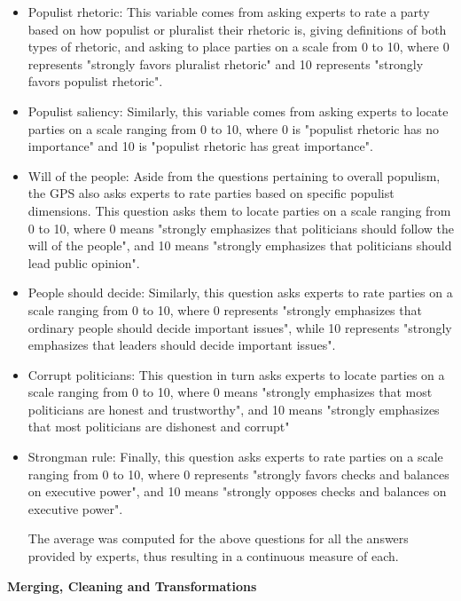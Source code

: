 \documentclass[12pt,letterpaper]{article}
\begin{document}
\begin{itemize}
	\item Populist rhetoric: This variable comes from asking experts to rate a party based on how populist or pluralist their rhetoric is, giving definitions of both types of rhetoric, and asking to place parties on a scale from 0 to 10, where 0 represents "strongly favors pluralist rhetoric" and 10 represents "strongly favors populist rhetoric". 
	\item Populist saliency: Similarly, this variable comes from asking experts to locate parties on a scale ranging from 0 to 10, where 0 is "populist rhetoric has no importance" and 10 is "populist rhetoric has great importance". 
	\item Will of the people: Aside from the questions pertaining to overall populism, the GPS also asks experts to rate parties based on specific populist dimensions. This question asks them to locate parties on a scale ranging from 0 to 10, where 0 means "strongly emphasizes that politicians should follow the will of the people", and 10 means "strongly emphasizes that politicians should lead public opinion".
	\item People should decide: Similarly, this question asks experts to rate parties on a scale ranging from 0 to 10, where 0 represents "strongly emphasizes that ordinary people should decide important issues", while 10 represents "strongly emphasizes that leaders should decide important issues". 
	\item Corrupt politicians: This question in turn asks experts to locate parties on a scale ranging from 0 to 10, where 0 means "strongly emphasizes that most politicians are honest and trustworthy", and 10 means "strongly emphasizes that most politicians are dishonest and corrupt"
	\item Strongman rule: Finally, this question asks experts to rate parties on a scale ranging from 0 to 10, where 0 represents "strongly favors checks and balances on executive power", and 10 means "strongly opposes checks and balances on executive power". 
	
\noindent The average was computed for the above questions for all the answers provided by experts, thus resulting in a continuous measure of each. 
	
\end{itemize}

\vspace{.25cm}
\noindent \textbf{Merging, Cleaning and Transformations}
\vspace{.25cm}
\end{document}
